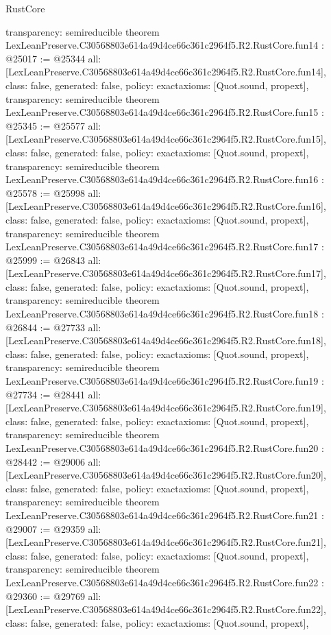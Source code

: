 \begin{lexlean}{RustCore}
\begin{coremodule}
{  transparency: semireducible
}
theorem LexLeanPreserve.C30568803e614a49d4ce66c361c2964f5.R2.RustCore.fun14 : @25017 := @25344 {
  all: [LexLeanPreserve.C30568803e614a49d4ce66c361c2964f5.R2.RustCore.fun14],
  class: false,
  generated: false,
  policy: exact{axioms: [Quot.sound, propext]},
  transparency: semireducible
}
theorem LexLeanPreserve.C30568803e614a49d4ce66c361c2964f5.R2.RustCore.fun15 : @25345 := @25577 {
  all: [LexLeanPreserve.C30568803e614a49d4ce66c361c2964f5.R2.RustCore.fun15],
  class: false,
  generated: false,
  policy: exact{axioms: [Quot.sound, propext]},
  transparency: semireducible
}
theorem LexLeanPreserve.C30568803e614a49d4ce66c361c2964f5.R2.RustCore.fun16 : @25578 := @25998 {
  all: [LexLeanPreserve.C30568803e614a49d4ce66c361c2964f5.R2.RustCore.fun16],
  class: false,
  generated: false,
  policy: exact{axioms: [Quot.sound, propext]},
  transparency: semireducible
}
theorem LexLeanPreserve.C30568803e614a49d4ce66c361c2964f5.R2.RustCore.fun17 : @25999 := @26843 {
  all: [LexLeanPreserve.C30568803e614a49d4ce66c361c2964f5.R2.RustCore.fun17],
  class: false,
  generated: false,
  policy: exact{axioms: [Quot.sound, propext]},
  transparency: semireducible
}
theorem LexLeanPreserve.C30568803e614a49d4ce66c361c2964f5.R2.RustCore.fun18 : @26844 := @27733 {
  all: [LexLeanPreserve.C30568803e614a49d4ce66c361c2964f5.R2.RustCore.fun18],
  class: false,
  generated: false,
  policy: exact{axioms: [Quot.sound, propext]},
  transparency: semireducible
}
theorem LexLeanPreserve.C30568803e614a49d4ce66c361c2964f5.R2.RustCore.fun19 : @27734 := @28441 {
  all: [LexLeanPreserve.C30568803e614a49d4ce66c361c2964f5.R2.RustCore.fun19],
  class: false,
  generated: false,
  policy: exact{axioms: [Quot.sound, propext]},
  transparency: semireducible
}
theorem LexLeanPreserve.C30568803e614a49d4ce66c361c2964f5.R2.RustCore.fun20 : @28442 := @29006 {
  all: [LexLeanPreserve.C30568803e614a49d4ce66c361c2964f5.R2.RustCore.fun20],
  class: false,
  generated: false,
  policy: exact{axioms: [Quot.sound, propext]},
  transparency: semireducible
}
theorem LexLeanPreserve.C30568803e614a49d4ce66c361c2964f5.R2.RustCore.fun21 : @29007 := @29359 {
  all: [LexLeanPreserve.C30568803e614a49d4ce66c361c2964f5.R2.RustCore.fun21],
  class: false,
  generated: false,
  policy: exact{axioms: [Quot.sound, propext]},
  transparency: semireducible
}
theorem LexLeanPreserve.C30568803e614a49d4ce66c361c2964f5.R2.RustCore.fun22 : @29360 := @29769 {
  all: [LexLeanPreserve.C30568803e614a49d4ce66c361c2964f5.R2.RustCore.fun22],
  class: false,
  generated: false,
  policy: exact{axioms: [Quot.sound, propext]},
}
\end{coremodule}
\end{lexlean}
